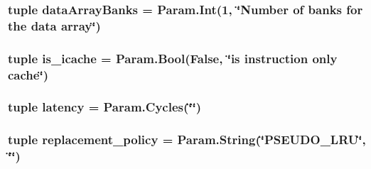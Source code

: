 \label{classCache_1_1RubyCache_aff29edacbeb0dfe8d5191cbde1450be2}
\hypertarget{classCache_1_1RubyCache_a881257012121ba173fad314a15c90cfd}{
\subsubsection[{dataArrayBanks}]{\setlength{\rightskip}{0pt plus 5cm}tuple {\bf dataArrayBanks} = Param.Int(1, \char`\"{}Number of banks for the data array\char`\"{})}}
\label{classCache_1_1RubyCache_a881257012121ba173fad314a15c90cfd}
\hypertarget{classCache_1_1RubyCache_aecbc924fc0d093572da628a0803f0d4f}{
\subsubsection[{is\_\-icache}]{\setlength{\rightskip}{0pt plus 5cm}tuple {\bf is\_\-icache} = Param.Bool(False, \char`\"{}is instruction only cache\char`\"{})}}
\label{classCache_1_1RubyCache_aecbc924fc0d093572da628a0803f0d4f}
\hypertarget{classCache_1_1RubyCache_ab6371bb71615c96debd0d27d34943fed}{
\subsubsection[{latency}]{\setlength{\rightskip}{0pt plus 5cm}tuple {\bf latency} = Param.Cycles(\char`\"{}\char`\"{})}}
\label{classCache_1_1RubyCache_ab6371bb71615c96debd0d27d34943fed}
\hypertarget{classCache_1_1RubyCache_abe3a9f09e93027c7a960442bd92af2da}{
\subsubsection[{replacement\_\-policy}]{\setlength{\rightskip}{0pt plus 5cm}tuple {\bf replacement\_\-policy} = Param.String(\char`\"{}PSEUDO\_\-LRU\char`\"{}, \char`\"{}\char`\"{})}}
